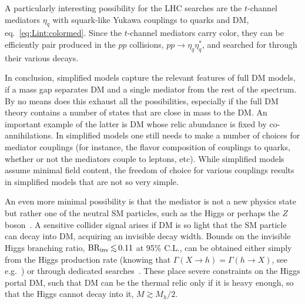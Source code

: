 A particularly interesting possibility for the LHC searches are the $t$-channel mediators $\eta_q$ with squark-like Yukawa
couplings to quarks and DM, eq.~\eqref{eq:Lint:colormed}.
Since the $t$-channel mediators carry color, they can be efficiently pair produced in the $pp$ collisions,  $pp\to \eta_q \eta_q^*$, and searched for through their various decays.

\medskip

In conclusion, simplified models capture the relevant features of full DM models, 
if  a mass gap separates DM and a single mediator from the rest of the spectrum. 
By no means does this exhaust all the possibilities, especially if the full DM theory contains a number of states that are close in mass to the DM. An important example of the latter is DM whose relic abundance is fixed by co-annihilations. In simplified models one still needs to make a number of choices for mediator couplings (for instance, the flavor composition of couplings to quarks, whether or not the mediators couple to leptons, etc). 
While simplified models assume minimal field content, the freedom of choice for various couplings results in simplified models that are not so very simple. 

\medskip

An even more minimal possibility is that the mediator is not a new physics state but rather one of the neutral SM particles, 
such as the Higgs or perhaps the $Z$ boson~\cite{SMmediators}.
A sensitive collider signal arises
if DM is so light that the SM particle can decay into DM, acquiring
an invisible decay width.
Bounds on the invisible Higgs branching ratio, 
$\hbox{BR}_{\rm inv} \circa{<}0.11$ at 95\% C.L., can be obtained either simply
from the Higgs production rate 
(knowing that $\Gamma(X\to h)=\Gamma(h\to X)$, see e.g.~\cite{1303.3570})
or through dedicated searches~\cite{htoinvisibles}. These place severe constraints on the Higgs portal DM, such that DM can be the thermal relic only if it is heavy enough, so that the Higgs cannot decay into it, $M\gtrsim M_h/2$. 


